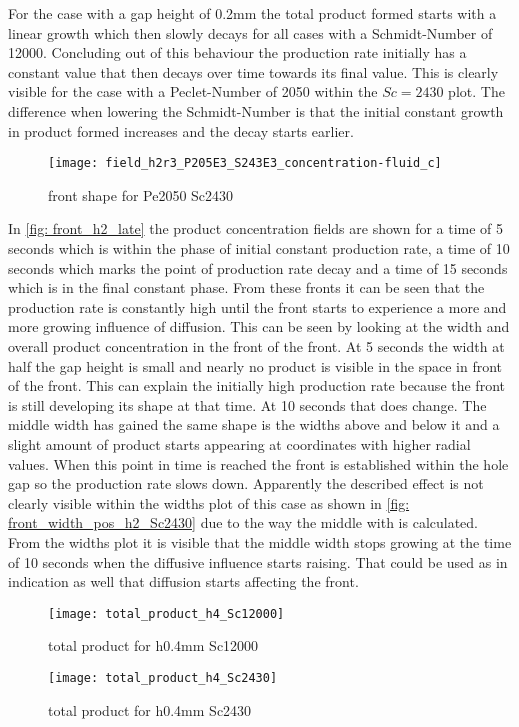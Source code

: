 \documentclass[../thesis.tex]{subfiles}
\begin{document}
For the case with a gap height of 0.2mm the total product formed starts with a linear growth which then slowly decays for all cases with a Schmidt-Number of 12000. Concluding out of this behaviour the production rate initially has a constant value that then decays over time towards its final value. This is clearly visible for the case with a Peclet-Number of 2050 within the $Sc = 2430$ plot. The difference when lowering the Schmidt-Number is that the initial constant growth in product formed increases and the decay starts earlier.
\begin{figure}[htb]
	\centering
	\texttt{[image: field\_h2r3\_P205E3\_S243E3\_concentration-fluid\_c]}
	\caption{front shape for Pe2050 Sc2430}
	\label{fig: front_h2_late}
\end{figure}
In \autoref{fig: front_h2_late} the product concentration fields are shown for a time of 5 seconds which is within the phase of initial constant production rate, a time of 10 seconds which marks the point of production rate decay and a time of 15 seconds which is in the final constant phase. From these fronts it can be seen that the production rate is constantly high until the front starts to experience a more and more growing influence of diffusion. This can be seen by looking at the width and overall product concentration in the front of the front. At 5 seconds the width at half the gap height is small and nearly no product is visible in the space in front of the front. This can explain the initially high production rate because the front is still developing its shape at that time. At 10 seconds that does change. The middle width has gained the same shape is the widths above and below it and a slight amount of product starts appearing at coordinates with higher radial values. When this point in time is reached the front is established within the hole gap so the production rate slows down. Apparently the described effect is not clearly visible within the widths plot of this case as shown in \autoref{fig: front_width_pos_h2_Sc2430} due to the way the middle with is calculated. From the widths plot it is visible that the middle width stops growing at the time of 10 seconds when the diffusive influence starts raising. That could be used as in indication as well that diffusion starts affecting the front.

\begin{figure}[htbp]
	\centering
	\texttt{[image: total\_product\_h4\_Sc12000]}
	\caption{total product for h0.4mm Sc12000\label{fig: total_prod_h4_Sc12000}}\bigskip
	\texttt{[image: total\_product\_h4\_Sc2430]}
	\caption{total product for h0.4mm Sc2430\label{fig: total_prod_h4_Sc2430}}
\end{figure}
\end{document}
